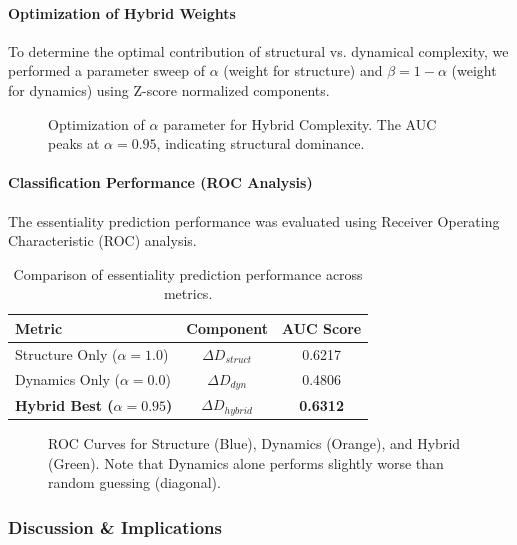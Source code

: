 \paragraph{Optimization of Hybrid Weights}
To determine the optimal contribution of structural vs. dynamical complexity, we performed a parameter sweep of $\alpha$ (weight for structure) and $\beta = 1 - \alpha$ (weight for dynamics) using Z-score normalized components.

\begin{figure}[H]
    \centering
    \caption{Optimization of $\alpha$ parameter for Hybrid Complexity. The AUC peaks at $\alpha=0.95$, indicating structural dominance.}
    \label{fig:alpha_opt}
\end{figure}

\paragraph{Classification Performance (ROC Analysis)}
The essentiality prediction performance was evaluated using Receiver Operating Characteristic (ROC) analysis.

\begin{table}[H]
    \centering
    \begin{tabular}{lcc}
        \toprule
        \textbf{Metric} & \textbf{Component} & \textbf{AUC Score} \\
        \midrule
        Structure Only ($\alpha=1.0$) & $\Delta D_{struct}$ & 0.6217 \\
        Dynamics Only ($\alpha=0.0$) & $\Delta D_{dyn}$ & 0.4806 \\
        \textbf{Hybrid Best ($\alpha=0.95$)} & $\Delta D_{hybrid}$ & \textbf{0.6312} \\
        \bottomrule
    \end{tabular}
    \caption{Comparison of essentiality prediction performance across metrics.}
    \label{tab:auc_results}
\end{table}

\begin{figure}[H]
    \centering
    \caption{ROC Curves for Structure (Blue), Dynamics (Orange), and Hybrid (Green). Note that Dynamics alone performs slightly worse than random guessing (diagonal).}
    \label{fig:roc_comp}
\end{figure}

\subsubsection{Discussion \& Implications}

